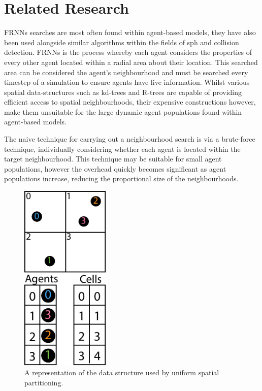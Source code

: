 \section{Related Research\label{sec:related-work}}
  FRNNs searches are most often found within agent-based models, they have also been used alongside similar algorithms within the fields of \gls{sph} and collision detection. FRNNs is the process whereby each agent considers the properties of every other agent located within a radial area about their location. This searched area can be considered the agent’s neighbourhood and must be searched every timestep of a simulation to ensure agents have live information. Whilst various spatial data-structures such as kd-trees and R-trees are capable of providing efficient access to spatial neighbourhoods, their expensive constructions however, make them unsuitable for the large dynamic agent populations found within agent-based models.

  The naive technique for carrying out a neighbourhood search is via a brute-force technique, individually considering whether each agent is located within the target neighbourhood. This technique may be suitable for small agent populations, however the overhead quickly becomes significant as agent populations increase, reducing the proportional size of the neighbourhoods.
\begin{figure}
  \begin{center}
    \includegraphics[width=0.38\textwidth]{../resources/usp/usp.pdf}
  \end{center}
  \caption{\label{fig:usp} A representation of the data structure used by uniform spatial partitioning.}
\end{figure}
  
